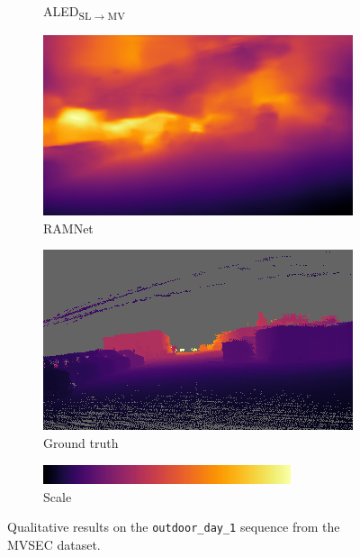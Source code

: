\begin{figure}
\begin{subfigure}{0.31\textwidth}
    \caption{ALED\textsubscript{SL\(\rightarrow\)MV}}\label{subfig:aled:mvsec_cmp:sl_mv}
  \end{subfigure}
  \begin{subfigure}{0.31\textwidth}
    \centering
    \includegraphics[width=\textwidth]{mainmatter/figures/4_depth_conv/mvsec_cmp/ramnet_cvt.png}
    \caption{RAMNet~\cite{Gehrig2021CombiningEA}}
  \end{subfigure}
  \hfill
  \begin{subfigure}{0.31\textwidth}
    \centering
    \includegraphics[width=\textwidth]{mainmatter/figures/4_depth_conv/mvsec_cmp/gt_ours_cropped_lightgray_fixed.png}
    \caption{Ground truth}
  \end{subfigure}
  \hfill
  \begin{subfigure}{0.31\textwidth}
    \centering
    \vspace{10mm}
    \includegraphics[width=0.8\textwidth]{mainmatter/figures/4_depth_conv/sled_content/scale.png}
    \vspace{6mm}
    \caption{Scale}
  \end{subfigure}
  \cprotect\caption{Qualitative results on the \verb|outdoor_day_1| sequence from the MVSEC dataset.}\label{fig:aled:mvsec_cmp}
\end{figure}

